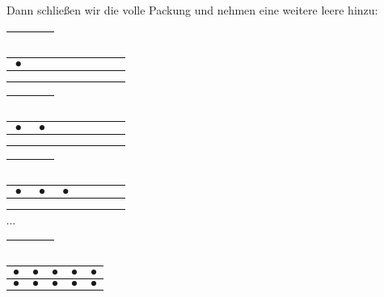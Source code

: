 \documentclass[a4paper]{amsart}
\theoremstyle{definition}
\begin{document}
Dann schließen wir die volle Packung und nehmen eine weitere leere hinzu:

\begin{tabular}{|cc|}
   \hline
   $\phantom\bullet$&$\phantom\bullet$\\
   \hline
\end{tabular}
\begin{tabular}{|c|c|c|c|c|}
   \hline
   $\bullet$ & $\phantom\bullet$ & $\phantom\bullet$ & $\phantom\bullet$ & $\phantom\bullet$\\
   \hline
   $\phantom\bullet$ & $\phantom\bullet$ & $\phantom\bullet$ & $\phantom\bullet$ & $\phantom\bullet$\\
   \hline
\end{tabular}

\begin{tabular}{|cc|}
   \hline
   $\phantom\bullet$&$\phantom\bullet$\\
   \hline
\end{tabular}
\begin{tabular}{|c|c|c|c|c|}
   \hline
   $\bullet$ & $\bullet$ & $\phantom\bullet$ & $\phantom\bullet$ & $\phantom\bullet$\\
   \hline
   $\phantom\bullet$ & $\phantom\bullet$ & $\phantom\bullet$ & $\phantom\bullet$ & $\phantom\bullet$\\
   \hline
\end{tabular}

\begin{tabular}{|cc|}
   \hline
   $\phantom\bullet$&$\phantom\bullet$\\
   \hline
\end{tabular}
\begin{tabular}{|c|c|c|c|c|}
   \hline
   $\bullet$ & $\bullet$ & $\bullet$ & $\phantom\bullet$ & $\phantom\bullet$\\
   \hline
   $\phantom\bullet$ & $\phantom\bullet$ & $\phantom\bullet$ & $\phantom\bullet$ & $\phantom\bullet$\\
   \hline
\end{tabular} $\cdots$

\begin{tabular}{|cc|}
   \hline
   $\phantom\bullet$&$\phantom\bullet$\\
   \hline
\end{tabular}
\begin{tabular}{|c|c|c|c|c|}
   \hline
   $\bullet$ & $\bullet$ & $\bullet$ & $\bullet$ & $\bullet$\\
   \hline
   $\bullet$ & $\bullet$ & $\bullet$ & $\bullet$ & $\bullet$\\
   \hline
\end{tabular}
\end{document}
